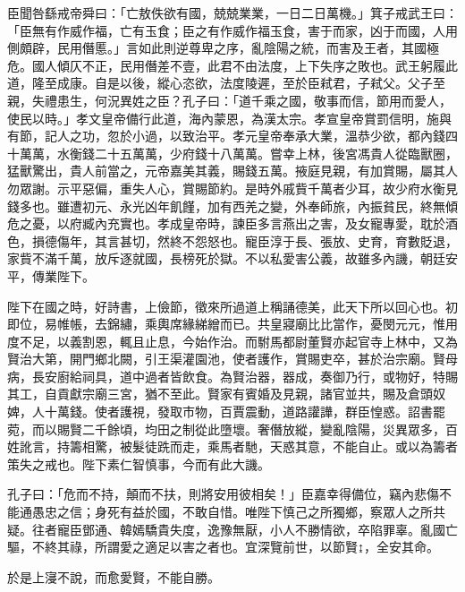 \begin{pinyinscope}
臣聞咎繇戒帝舜曰：「亡敖佚欲有國，兢兢業業，一日二日萬機。」箕子戒武王曰：「臣無有作威作福，亡有玉食；臣之有作威作福玉食，害于而家，凶于而國，人用側頗辟，民用僭慝。」言如此則逆尊卑之序，亂陰陽之統，而害及王者，其國極危。國人傾仄不正，民用僭差不壹，此君不由法度，上下失序之敗也。武王躬履此道，隆至成康。自是以後，縱心恣欲，法度陵遲，至於臣弒君，子弒父。父子至親，失禮患生，何況異姓之臣？孔子曰：「道千乘之國，敬事而信，節用而愛人，使民以時。」孝文皇帝備行此道，海內蒙恩，為漢太宗。孝宣皇帝賞罰信明，施與有節，記人之功，忽於小過，以致治平。孝元皇帝奉承大業，溫恭少欲，都內錢四十萬萬，水衡錢二十五萬萬，少府錢十八萬萬。嘗幸上林，後宮馮貴人從臨獸圈，猛獸驚出，貴人前當之，元帝嘉美其義，賜錢五萬。掖庭見親，有加賞賜，屬其人勿眾謝。示平惡偏，重失人心，賞賜節約。是時外戚貲千萬者少耳，故少府水衡見錢多也。雖遭初元、永光凶年飢饉，加有西羌之變，外奉師旅，內振貧民，終無傾危之憂，以府臧內充實也。孝成皇帝時，諫臣多言燕出之害，及女寵專愛，耽於酒色，損德傷年，其言甚切，然終不怨怒也。寵臣淳于長、張放、史育，育數貶退，家貲不滿千萬，放斥逐就國，長榜死於獄。不以私愛害公義，故雖多內譏，朝廷安平，傳業陛下。

陛下在國之時，好詩書，上儉節，徵來所過道上稱誦德美，此天下所以回心也。初即位，易帷帳，去錦繡，乘輿席緣綈繒而已。共皇寢廟比比當作，憂閔元元，惟用度不足，以義割恩，輒且止息，今始作治。而駙馬都尉董賢亦起官寺上林中，又為賢治大第，開門鄉北闕，引王渠灌園池，使者護作，賞賜吏卒，甚於治宗廟。賢母病，長安廚給祠具，道中過者皆飲食。為賢治器，器成，奏御乃行，或物好，特賜其工，自貢獻宗廟三宮，猶不至此。賢家有賓婚及見親，諸官並共，賜及倉頭奴婢，人十萬錢。使者護視，發取市物，百賈震動，道路讙譁，群臣惶惑。詔書罷菀，而以賜賢二千餘頃，均田之制從此墮壞。奢僭放縱，變亂陰陽，災異眾多，百姓訛言，持籌相驚，被髮徒跣而走，乘馬者馳，天惑其意，不能自止。或以為籌者策失之戒也。陛下素仁智慎事，今而有此大譏。

孔子曰：「危而不持，顛而不扶，則將安用彼相矣！」臣嘉幸得備位，竊內悲傷不能通愚忠之信；身死有益於國，不敢自惜。唯陛下慎己之所獨鄉，察眾人之所共疑。往者寵臣鄧通、韓嫣驕貴失度，逸豫無厭，小人不勝情欲，卒陷罪辜。亂國亡驅，不終其祿，所謂愛之適足以害之者也。宜深覽前世，以節賢↨，全安其命。

於是上寖不說，而愈愛賢，不能自勝。


\end{pinyinscope}
